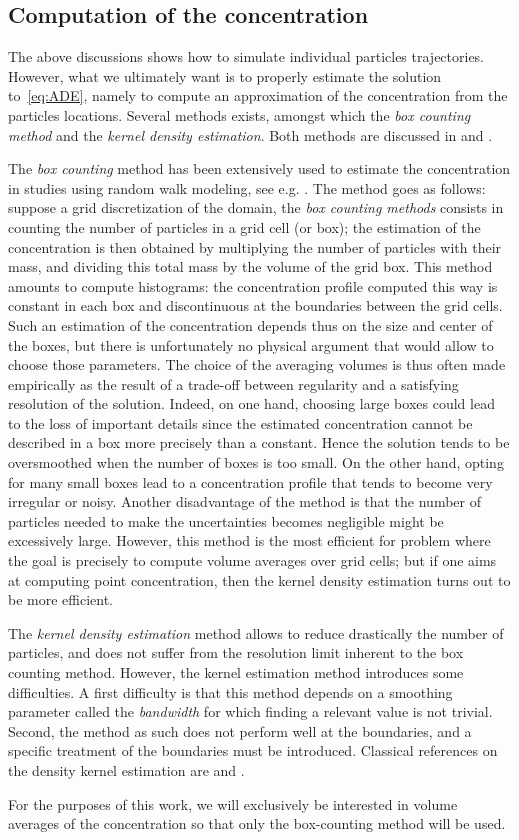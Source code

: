 \subsection{Computation of the concentration} \label{boxcounting_kernel}
The above discussions shows how to simulate individual particles trajectories. However, what we ultimately want is to properly estimate the solution to~\eqref{eq:ADE}, namely to compute an approximation of the concentration from the particles locations. Several methods exists, amongst which the \textit{box counting method} and the \textit{kernel density estimation}. Both methods are discussed in \cite{spivakovskaya2007lagrangian} and \cite{dehaan1999densitykernel}.

The \textit{box counting} method has been extensively used to estimate the concentration in studies using random walk modeling, see e.g. \cite{riddle1998specification}. The method goes as follows: suppose a grid discretization of the domain, the \textit{box counting methods} consists in counting the number of particles in a grid cell (or box); the estimation of the concentration is then obtained by multiplying the number of particles with their mass, and dividing this total mass by the volume of the grid box. This method amounts to compute histograms: the concentration profile computed this way is constant in each box and discontinuous at the boundaries between the grid cells. Such an estimation of the concentration depends thus on the size and center of the boxes, but there is unfortunately no physical argument that would allow to choose those parameters. The choice of the averaging volumes is thus often made empirically as the result of a trade-off between regularity and a satisfying resolution of the solution. Indeed, on one hand, choosing large boxes could lead to the loss of important details since the estimated concentration cannot be described in a box more precisely than a constant. Hence the solution tends to be oversmoothed when the number of boxes is too small. On the other hand, opting for many small boxes lead to a concentration profile that tends to become very irregular or noisy. Another disadvantage of the method is that the number of particles needed to make the uncertainties becomes negligible might be excessively large. However, this method is the most efficient for problem where the goal is precisely to compute volume averages over grid cells; but if one aims at computing point concentration, then the kernel density estimation turns out to be more efficient.

The \textit{kernel density estimation} method allows to reduce drastically the number of particles, and does not suffer from the resolution limit inherent to the box counting method. However, the kernel estimation method introduces some difficulties. A first difficulty is that this method depends on a smoothing parameter called the \textit{bandwidth} for which finding a relevant value is not trivial. Second, the method as such does not perform well at the boundaries, and a specific treatment of the boundaries must be introduced. Classical references on the density kernel estimation are \cite{silverman1986density} and \cite{wand1995kernel}.

For the purposes of this work, we will exclusively be interested in volume averages of the concentration so that only the box-counting method will be used.
